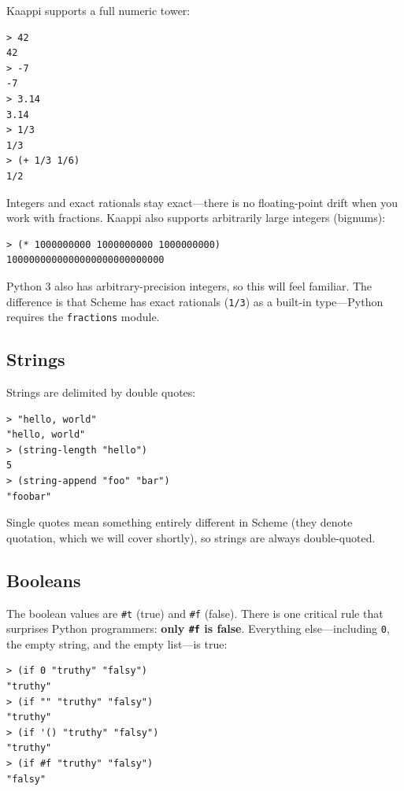 Kaappi supports a full numeric tower:

\begin{lstlisting}[style=repl]
> 42
42
> -7
-7
> 3.14
3.14
> 1/3
1/3
> (+ 1/3 1/6)
1/2
\end{lstlisting}

Integers and exact rationals stay exact---there is no floating-point drift when you work with fractions. Kaappi also supports arbitrarily large integers (bignums):

\begin{lstlisting}[style=repl]
> (* 1000000000 1000000000 1000000000)
1000000000000000000000000000
\end{lstlisting}

\begin{note}
Python 3 also has arbitrary-precision integers, so this will feel familiar. The difference is that Scheme has exact rationals (\texttt{1/3}) as a built-in type---Python requires the \texttt{fractions} module.
\end{note}

\subsection{Strings}

Strings are delimited by double quotes:

\begin{lstlisting}[style=repl]
> "hello, world"
"hello, world"
> (string-length "hello")
5
> (string-append "foo" "bar")
"foobar"
\end{lstlisting}

Single quotes mean something entirely different in Scheme (they denote quotation, which we will cover shortly), so strings are always double-quoted.

\subsection{Booleans}

The boolean values are \texttt{\#t} (true) and \texttt{\#f} (false). There is one critical rule that surprises Python programmers: \textbf{only \texttt{\#f} is false}. Everything else---including \texttt{0}, the empty string, and the empty list---is true:

\begin{lstlisting}[style=repl]
> (if 0 "truthy" "falsy")
"truthy"
> (if "" "truthy" "falsy")
"truthy"
> (if '() "truthy" "falsy")
"truthy"
> (if #f "truthy" "falsy")
"falsy"
\end{lstlisting}

